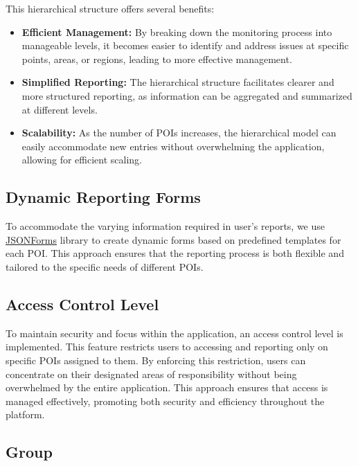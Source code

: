 This hierarchical structure offers several benefits:

\begin{itemize}
    \item \textbf{Efficient Management:} By breaking down the monitoring process into manageable levels, it becomes easier to identify and address issues at specific points, areas, or regions, leading to more effective management.
    \item \textbf{Simplified Reporting:}  The hierarchical structure facilitates clearer and more structured reporting, as information can be aggregated and summarized at different levels.
    \item \textbf{Scalability:} As the number of POIs increases, the hierarchical model can easily accommodate new entries without overwhelming the application, allowing for efficient scaling.
\end{itemize}

\subsection{Dynamic Reporting Forms}
\label{subsec:internship_experience:dynamic_reporting_forms}

To accommodate the varying information required in user's reports, we use \href{https://jsonforms.io/}{JSONForms} library to create dynamic forms based on predefined templates for each POI\@. This approach ensures that the reporting process is both flexible and tailored to the specific needs of different POIs.

\subsection{Access Control Level}
\label{subsec:internship_experience:access_control_level}

To maintain security and focus within the application, an access control level is implemented. This feature restricts users to accessing and reporting only on specific POIs assigned to them. By enforcing this restriction, users can concentrate on their designated areas of responsibility without being overwhelmed by the entire application. This approach ensures that access is managed effectively, promoting both security and efficiency throughout the platform.

\subsection{Group}
\label{subsec:internship_experience:group}

